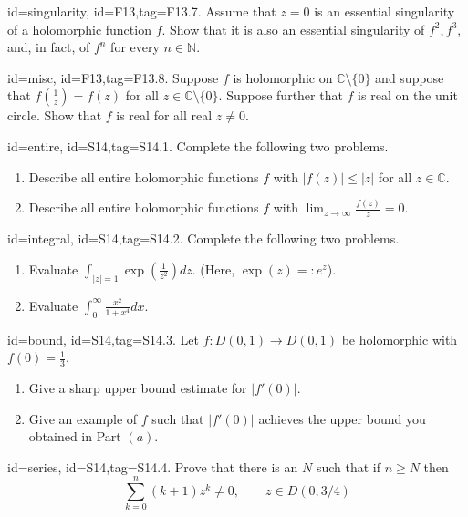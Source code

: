 \documentclass[12pt,letterpaper]{article}
\theoremstyle{plain}
\theoremstyle{definition}
\begin{document}
{\item[id=singularity, id=F13,tag=F13.7.]
Assume that $z = 0$ is an essential singularity of a holomorphic function $f$. Show that it is also an essential singularity of $f^2, f^3$, and, in fact, of $f^n$ for every $n \in \mathbb{N}$.

\item[id=misc, id=F13,tag=F13.8.]
Suppose $f$ is holomorphic on $\mathbb{C} \setminus \{0\}$ and suppose that $f\left(\frac{1}{z}\right) = f(z)$ for all $z \in \mathbb{C} \setminus \{0\}$. Suppose further that $f$ is real on the unit circle. Show that $f$ is real for all real $z \ne 0$.


\item[id=entire, id=S14,tag=S14.1.]
Complete the following two problems.
\begin{enumerate}[label=(\alph*)]\onlyitems
\item Describe all entire holomorphic functions $f$ with $| f(z) | \le | z |$ for all $z \in \mathbb{C}$.
\item Describe all entire holomorphic functions $f$ with $\lim_{z\rightarrow \infty} \frac{f(z)}{z} = 0$.
\end{enumerate}

\item[id=integral, id=S14,tag=S14.2.]
Complete the following two problems.
\begin{enumerate}[label=(\alph*)]\onlyitems
\item Evaluate $\int_{| z | = 1} \exp\left(\frac{1}{z^2}\right) dz$. (Here, $\exp(z) =: e^z$).
\item Evaluate $\int_{0}^{\infty} \frac{x^2}{1+x^4} dx$.
\end{enumerate}
\item[id=bound, id=S14,tag=S14.3.]
Let $f : D(0,1) \rightarrow D(0,1)$ be holomorphic with $f(0) = \frac{1}{3}$.
\begin{enumerate}[label=(\alph*)]\onlyitems
\item Give a sharp upper bound estimate for $| f'(0) |$.
\item Give an example of $f$ such that $| f'(0) |$ achieves the upper bound you obtained in Part $(a)$.
\end{enumerate}

\item[id=series, id=S14,tag=S14.4.]
Prove that there is an $N$ such that if $n \ge N$ then
\[
	\sum_{k=0}^{n} (k+1) z^k \ne 0, \qquad z \in D(0,3/4)
\]

}
\end{document}

